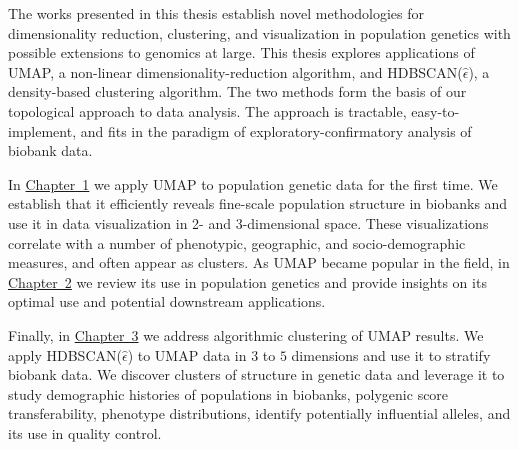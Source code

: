 The works presented in this thesis establish novel methodologies for dimensionality reduction, clustering, and visualization in population genetics with possible extensions to genomics at large. This thesis explores applications of UMAP, a non-linear dimensionality-reduction algorithm, and HDBSCAN($\hat{\epsilon}$), a density-based clustering algorithm. The two methods form the basis of our topological approach to data analysis. The approach is tractable, easy-to-implement, and fits in the paradigm of exploratory-confirmatory analysis of biobank data.

In \hyperref[chap:chapter1]{Chapter~1} we apply UMAP to population genetic data for the first time. We establish that it efficiently reveals fine-scale population structure in biobanks and use it in data visualization in 2- and 3-dimensional space. These visualizations correlate with a number of phenotypic, geographic, and socio-demographic measures, and often appear as clusters. As UMAP became popular in the field, in \hyperref[chap:chapter2]{Chapter~2} we review its use in population genetics and provide insights on its optimal use and potential downstream applications.

Finally, in \hyperref[chap:chapter3]{Chapter~3} we address algorithmic clustering of UMAP results. We apply HDBSCAN($\hat{\epsilon}$) to UMAP data in $3$ to $5$ dimensions and use it to stratify biobank data. We discover clusters of structure in genetic data and leverage it to study demographic histories of populations in biobanks, polygenic score transferability, phenotype distributions, identify potentially influential alleles, and its use in quality control.